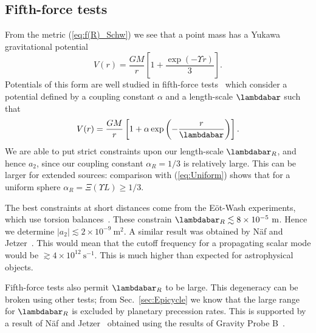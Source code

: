 \documentclass[aps,prd,amsfonts,amssymb,amsmath,nofootinbib,reprint,showpacs]{revtex4-1}
\newcommand{\eqnref}[1]{(\ref{eq:#1})}
\newcommand{\secref}[1]{Sec.\ \ref{sec:#1}}
\newcommand{\units}[1]{\ensuremath{~\mathrm{#1}}}
\begin{document}
\subsection{Fifth-force tests\label{sec:Fifth}}

From the metric \eqnref{f(R)_Schw} we see that a point mass has a Yukawa gravitational potential~\cite{Stelle1978, Capozziello2009a, Naf2010}
\begin{equation}
V(r) = \frac{GM}{r}\left[1 + \frac{\exp(- \Upsilon r)}{3}\right].
\end{equation}
Potentials of this form are well studied in fifth-force tests~\cite{Will2006, Adelberger2009, Adelberger2003} which consider a potential defined by a coupling constant $\alpha$ and a length-scale $\lambdabar$ such that
\begin{equation}
V(r) = \frac{GM}{r}\left[1 + \alpha\exp\left(-\frac{r}{\lambdabar}\right)\right].
\end{equation}
We are able to put strict constraints upon our length-scale $\lambdabar_R$, and hence $a_2$, since our coupling constant $\alpha_R = 1/3$ is relatively large. This can be larger for extended sources: comparison with \eqnref{Uniform} shows that for a uniform sphere $\alpha_R = \Xi(\Upsilon L) \geq 1/3$.

The best constraints at short distances come from the E\"{o}t-Wash experiments, which use torsion balances~\cite{Kapner2007a, Hoyle2004}. These constrain $\lambdabar_R \lesssim 8\times 10^{-5}\units{m}$. Hence we determine $|a_2| \lesssim 2 \times 10^{-9}\units{m^2}$. A similar result was obtained by N\"{a}f and Jetzer~\cite{Naf2010}. This would mean that the cutoff frequency for a propagating scalar mode would be $\gtrsim 4 \times 10^{12}\units{s^{-1}}$. This is much higher than expected for astrophysical objects.

Fifth-force tests also permit $\lambdabar_R$ to be large. This degeneracy can be broken using other tests; from \secref{Epicycle} we know that the large range for $\lambdabar_R$ is excluded by planetary precession rates. This is supported by a result of N\"{a}f and Jetzer~\cite{Naf2010} obtained using the results of Gravity Probe B~\cite{Everitt2009}.
\end{document}
